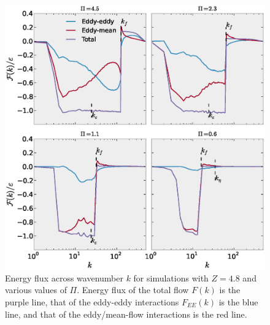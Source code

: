 \documentclass{ametsoc}
\begin{document}
\begin{figure}
\begin{center}
\includegraphics[width=6in]{NLflux_drag8e-4}\caption{Energy flux across wavenumber $k$ for simulations with $Z=4.8$ and
various values of $\Pi$. Energy flux of the total flow $F(k)$ is
the purple line, that of the eddy-eddy interactions $F_{EE}(k)$ is
the blue line, and that of the eddy/mean-flow interactions is the
red line.}
\label{energy_flux_drag8e-4}
\end{center}
\end{figure}
\end{document}
